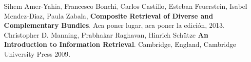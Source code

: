 \begin{thebibliography}{9}
  Sihem Amer-Yahia, Francesco Bonchi, Carlos Castillo,
  Esteban Feuerstein, Isabel Mendez-Diaz, Paula Zabala,
  \textbf{Composite Retrieval of Diverse and Complementary Bundles}.
  Aca poner lugar,
  aca poner la edición,
  2013.
  Christopher D. Manning, Prabhakar Raghavan, Hinrich Schütze
  \textbf{An Introduction to Information Retrieval}.
  Cambridge, England,
  Cambridge University Press
  2009.
\end{thebibliography} 
